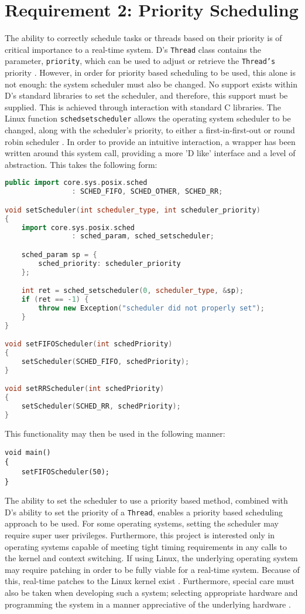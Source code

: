 \section{Requirement 2: Priority Scheduling}
The ability to correctly schedule tasks or threads based on their priority is of 
critical importance to a real-time system. D's \texttt{Thread} class contains the
parameter, \texttt{priority}, which can be used to adjust or retrieve 
the \texttt{Thread's} priority \cite{core-thread}. 
However, in order for priority based scheduling to be used, this alone is not 
enough: the system scheduler must also be changed.
No support exists within D's standard libraries to set the scheduler, and therefore, 
this support must be supplied. 
This is achieved through interaction with standard C libraries. 
The Linux function \texttt{sched\textunderscore{}setscheduler} allows the operating system 
scheduler to be changed, along with the scheduler's priority, to either a 
first-in-first-out or round robin scheduler \cite{sched-setscheduler}. 
In order to provide an intuitive interaction, a wrapper has been written around
this system call, providing a more 'D like' interface and a level of
abstraction. This takes the following form:
\begin{lstlisting}[basicstyle=\small,language=C++]
public import core.sys.posix.sched 
                : SCHED_FIFO, SCHED_OTHER, SCHED_RR; 

void setScheduler(int scheduler_type, int scheduler_priority)
{
    import core.sys.posix.sched 
                : sched_param, sched_setscheduler; 

    sched_param sp = { 
        sched_priority: scheduler_priority 
    }; 

    int ret = sched_setscheduler(0, scheduler_type, &sp); 
    if (ret == -1) {
        throw new Exception("scheduler did not properly set");
    }
}

void setFIFOScheduler(int schedPriority)
{
    setScheduler(SCHED_FIFO, schedPriority);
}

void setRRScheduler(int schedPriority)
{
    setScheduler(SCHED_RR, schedPriority); 
}
\end{lstlisting}
This functionality may then be used in the following manner: 
\begin{lstlisting}[basicstyle=\small]
void main()
{
    setFIFOScheduler(50); 
}
\end{lstlisting}
The ability to set the scheduler to use a priority based method, combined with 
D's ability to set the priority of a \texttt{Thread}, enables a 
priority based scheduling approach to be used. 
For some operating systems, setting the scheduler may require super user privileges. 
Furthermore, this project is interested only in operating systems capable of meeting tight timing 
requirements in any calls to the kernel and context switching.
If using Linux, the underlying operating system may require patching in order 
to be fully viable for a real-time system. Because of this, real-time patches 
to the Linux kernel exist \cite{rt-wiki}. 
Furthermore, special care must also be taken when developing such a system;
selecting appropriate hardware and programming the system in a manner appreciative 
of the underlying hardware \cite{rt-wiki-how-to}.


